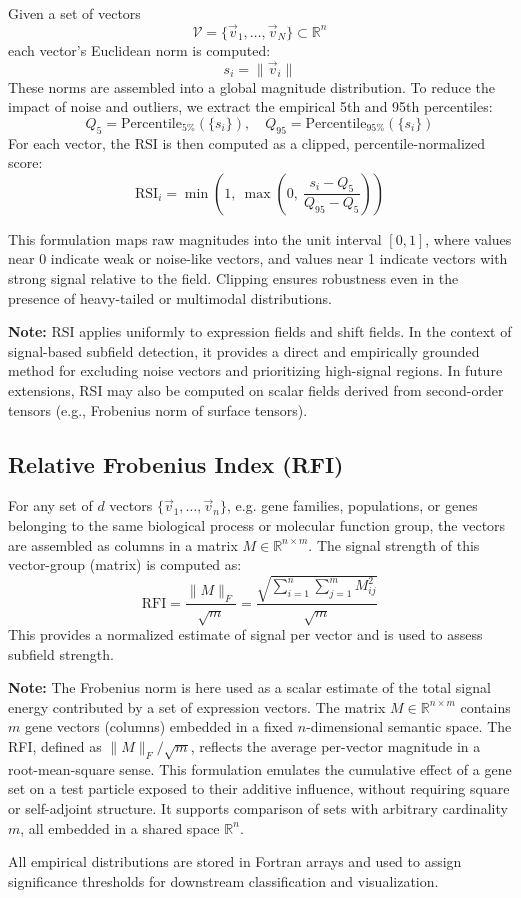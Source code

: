         Given a set of vectors
        \[
            \mathcal{V} = \{ \vec{v}_1, \dots, \vec{v}_N \} \subset \mathbb{R}^n
        \]
        each vector's Euclidean norm is computed:
        \[
            s_i = \| \vec{v}_i \|
        \]
        These norms are assembled into a global magnitude distribution. To reduce the impact of noise and outliers, we extract the empirical 5th and 95th percentiles:
        \[
            Q_5 = \text{Percentile}_{5\%}(\{s_i\}), \quad Q_{95} = \text{Percentile}_{95\%}(\{s_i\})
        \]
        For each vector, the RSI is then computed as a clipped, percentile-normalized score:
        \[
            \text{RSI}_i = \min\left(1,\ \max\left(0,\ \frac{s_i - Q_5}{Q_{95} - Q_5}\right)\right)
        \]

        This formulation maps raw magnitudes into the unit interval \([0, 1]\), where values near 0 indicate weak or noise-like vectors, and values near 1 indicate vectors with strong signal relative to the field. Clipping ensures robustness even in the presence of heavy-tailed or multimodal distributions.

        \textbf{Note:} RSI applies uniformly to expression fields and shift fields. In the context of signal-based subfield detection, it provides a direct and empirically grounded method for excluding noise vectors and prioritizing high-signal regions. In future extensions, RSI may also be computed on scalar fields derived from second-order tensors (e.g., Frobenius norm of surface tensors).

    \subsection{Relative Frobenius Index (RFI)}

        For any set of $d$ vectors \( \{ \vec{v}_1, \dots, \vec{v}_n \} \), e.g. gene
        families, populations, or genes belonging to the same biological process or
        molecular function group, the vectors are assembled as columns in a matrix
        \( M \in \mathbb{R}^{n \times m} \). The signal strength of this vector-group
        (matrix) is computed as:
        \[
            \text{RFI} = \frac{\|M\|_F}{\sqrt{m}} = \frac{\sqrt{\sum_{i=1}^{n} \sum_{j=1}^{m} M_{ij}^2}}{\sqrt{m}}
        \]
        This provides a normalized estimate of signal per vector and is used to assess
        subfield strength.

        \textbf{Note:} The Frobenius norm is here used as a scalar estimate of the
        total signal energy contributed by a set of expression vectors. The matrix \( M
        \in \mathbb{R}^{n \times m} \) contains \( m \) gene vectors (columns) embedded
        in a fixed \( n \)-dimensional semantic space. The RFI, defined as \( \|M\|_F /
        \sqrt{m} \), reflects the average per-vector magnitude in a root-mean-square
        sense. This formulation emulates the cumulative effect of a gene set on a test
        particle exposed to their additive influence, without requiring square or
        self-adjoint structure. It supports comparison of sets with arbitrary
        cardinality \( m \), all embedded in a shared space \( \mathbb{R}^n \).

        \vspace{2em}

        All empirical distributions are stored in Fortran arrays and used to assign
        significance thresholds for downstream classification and visualization.